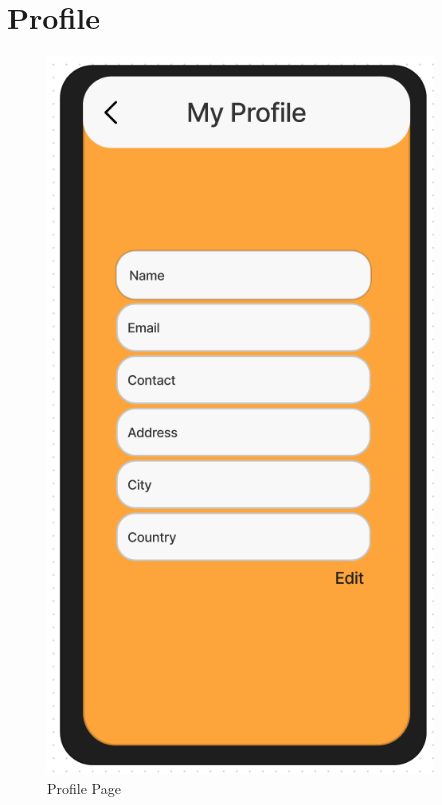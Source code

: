 \documentclass[title page]{article}
\begin{document}
\section{Profile}
\begin{figure}[!h]
    \begin{center}
          \includegraphics[height=19cm]{images/profile.png}
          \caption{Profile Page}
          \label{fig:profile}
    \end{center}
\end{figure}
\end{document}
